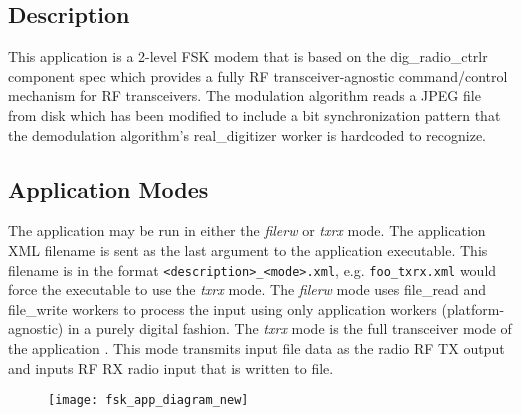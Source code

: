 \tableofcontents
\listoffigures
\newpage

\begin{landscape}

  \section{Description}

    This application is a 2-level FSK modem that is based on the dig\_radio\_ctrlr
    component spec
    which provides a fully RF transceiver-agnostic command/control mechanism for RF
    transceivers.
    The modulation algorithm reads a JPEG file from disk which has been modified to
    include a bit synchronization pattern that the demodulation algorithm's
    real\_digitizer
    worker is hardcoded to
    recognize.

    \subsection{Application Modes}

      The application may be run in either the \textit{filerw} or \textit{txrx}
      mode.
      The application XML filename is sent as the last argument to the
      application executable. This filename is in the format
      \texttt{<description>\_<mode>.xml}, e.g. \texttt{foo\_txrx.xml} would force
      the executable to use the
      \textit{txrx} mode.
      The \textit{filerw} mode uses file\_read and file\_write workers to
      process the input using only application workers (platform-agnostic) in a
      purely digital fashion.
      The \textit{txrx} mode is the full transceiver mode of the application
      . This mode transmits input file data as the
      radio RF TX output and inputs RF RX radio input that is written to file.

      {\centering

      \begin{figure}[htpb]
        \centering
        \captionsetup{type=figure}\texttt{[image: fsk\_app\_diagram\_new]}
        \label{fig:app_diagram_new}
      \end{figure}}


\end{landscape}
